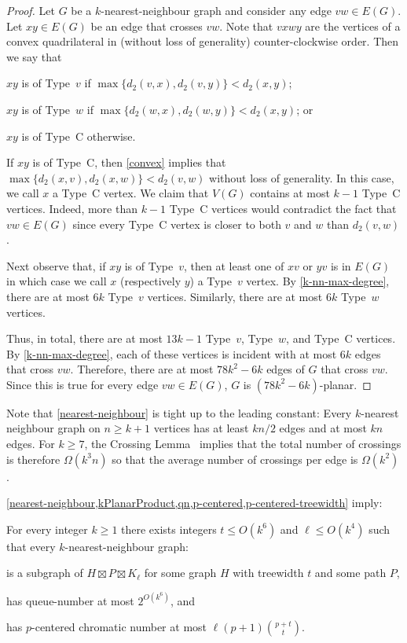 \documentclass{patmorin}
\renewcommand{\ge}{\geqslant}
\renewcommand{\geq}{\geqslant}
\renewcommand{\leq}{\leqslant}
\begin{document}
\begin{proof}
  Let $G$ be a $k$-nearest-neighbour graph and consider any edge $vw\in E(G)$.
  Let $xy\in E(G)$ be an edge that crosses $vw$.  Note that $vxwy$ are the vertices of a convex quadrilateral in (without loss of generality) counter-clockwise order. Then we say that
  \begin{compactenum}
    \item $xy$ is of Type~$v$ if $\max\{d_2(v,x), d_2(v,y)\}< d_2(x,y)$;
    \item $xy$ is of Type~$w$ if $\max\{d_2(w,x), d_2(w,y)\}< d_2(x,y)$; or
    \item $xy$ is of Type~C otherwise.
  \end{compactenum}
  If $xy$ is of Type~C, then \cref{convex} implies that $\max\{d_2(x,v),d_2(x,w)\} < d_2(v,w)$ without loss of generality.
   In this case, we call $x$ a Type~C vertex.  We claim that $V(G)$ contains at most $k-1$ Type~C vertices.  Indeed, more than $k-1$ Type~C vertices would contradict the fact that $vw\in E(G)$ since every Type~C vertex is closer to both $v$ and $w$ than $d_2(v,w)$.

  Next observe that, if $xy$ is of Type~$v$, then at least one of $xv$ or $yv$ is in $E(G)$ in which case we call $x$ (respectively $y$) a Type~$v$ vertex.  By \cref{k-nn-max-degree}, there are at most $6k$ Type~$v$ vertices.  Similarly, there are at most $6k$ Type~$w$ vertices.

  Thus, in total, there are at most $13k-1$ Type~$v$, Type~$w$, and Type~C vertices. By \cref{k-nn-max-degree}, each of these vertices is incident with at most $6k$ edges that cross $vw$. Therefore, there are at most $78k^2-6k$ edges of $G$ that cross $vw$.  Since this is true for every edge $vw\in E(G)$, $G$ is $(78k^2-6k)$-planar.
\end{proof}

Note that \cref{nearest-neighbour} is tight up to the leading constant:  Every $k$-nearest neighbour graph on $n\ge k+1$ vertices has at least $kn/2$ edges and at most $kn$ edges.  For $k\ge 7$, the Crossing Lemma~\citep{ajtai.chvatal.ea:crossing-free,leighton:complexity} implies that the total number of crossings is therefore $\Omega(k^3n)$ so that the average number of crossings per edge is $\Omega(k^2)$.

\cref{nearest-neighbour,kPlanarProduct,qn,p-centered,p-centered-treewidth} imply:

\begin{cor}
\label{k-nn}
For every integer $k\geq 1$ there exists integers $t\leq O(k^6)$ and $\ell\leq O(k^4)$ such that every $k$-nearest-neighbour graph:
\begin{compactitem}
\item is a subgraph of $H\boxtimes P \boxtimes K_\ell$ for some graph $H$ with treewidth $t$ and some path $P$,
\item has queue-number at most $2^{O(k^6)}$, and
\item has $p$-centered chromatic number at most $\ell (p+1)\binom{p+t}{t}$.
\end{compactitem}
\end{cor}
\end{document}
